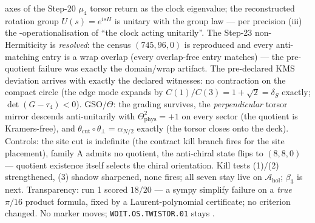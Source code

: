 axes of the Step-20 $\mu_4$ torsor return as the clock eigenvalue; the reconstructed rotation
group $U(s) = e^{isH}$ is unitary with the group law --- per precision (iii) the
\mC-operationalisation of ``the clock acting unitarily''. The Step-23 non-Hermiticity is
\emph{resolved}: the census $(745, 96, 0)$ is reproduced and every anti-matching entry is a
wrap overlap (every overlap-free entry matches) --- the pre-quotient failure was exactly the
domain/wrap artifact. The pre-declared KMS deviation arrives with exactly the declared
witnesses: no contraction on the compact circle (the edge mode expands by $C(1)/C(3) = 1 +
\sqrt2 = \delta_S$ exactly; $\det(G - \tau_4) < 0$). GSO/$\Theta$: the grading survives, the
\emph{perpendicular} torsor mirror descends anti-unitarily with $\Theta_{\mathrm{phys}}^2 =
+1$ on every sector (the quotient is Kramers-free), and $\theta_{\mathrm{cut}}\circ
\theta_\perp = \alpha_{N/2}$ exactly (the torsor closes onto the deck). Controls: the site
cut is indefinite (the contract kill branch fires for the site placement), family A admits no
quotient, the anti-chiral state flips to $(8,8,0)$ --- quotient existence itself selects the
chiral orientation. Kill tests (1)/(2) strengthened, (3) shadow sharpened, none fires; all
seven stay live on $\mathcal A_{\mathrm{hol}}$; $\beta_3$ is next. Transparency: run 1 scored
$18/20$ --- a sympy simplify failure on a \emph{true} $\pi/16$ product formula, fixed by a
Laurent-polynomial certificate; no criterion changed. No marker moves;
\texttt{WOIT.OS.TWISTOR.01} stays \mO.
